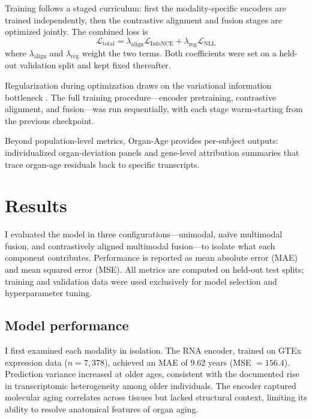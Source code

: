 \documentclass[10pt,twocolumn]{article}
\begin{document}
Training follows a staged curriculum: first the modality-specific encoders are trained
independently, then the contrastive alignment and fusion stages are optimized jointly. The
combined loss is
\begin{equation}
\mathcal{L}_{\text{total}}
=
\lambda_{\text{align}} \mathcal{L}_{\text{InfoNCE}}
+
\lambda_{\text{reg}} \mathcal{L}_{\text{NLL}}
\label{eq:total_loss}
\end{equation}
where $\lambda_{\text{align}}$ and $\lambda_{\text{reg}}$ weight the two terms. Both
coefficients were set on a held-out validation split and kept fixed thereafter.

Regularization during optimization draws on the variational information bottleneck
\cite{alemi2016vib}. The full training procedure---encoder pretraining, contrastive alignment,
and fusion---was run sequentially, with each stage warm-starting from the previous checkpoint.

Beyond population-level metrics, Organ-Age provides per-subject outputs: individualized
organ-deviation panels and gene-level attribution summaries that trace organ-age residuals
back to specific transcripts.

\section{Results}

I evaluated the model in three configurations---unimodal, na\"ive multimodal fusion, and
contrastively aligned multimodal fusion---to isolate what each component contributes.
Performance is reported as mean absolute error (MAE) and mean squared error (MSE).
All metrics are computed on held-out test splits; training and validation data were used
exclusively for model selection and hyperparameter tuning.

\subsection{Model performance}

I first examined each modality in isolation. The RNA encoder, trained on GTEx expression data
($n = 7{,}378$), achieved an MAE of 9.62 years (MSE $= 156.4$). Prediction
variance increased at older ages, consistent with the documented rise in transcriptomic
heterogeneity among older individuals. The encoder captured molecular aging correlates across
tissues but lacked structural context, limiting its ability to resolve anatomical features of
organ aging.
\end{document}
